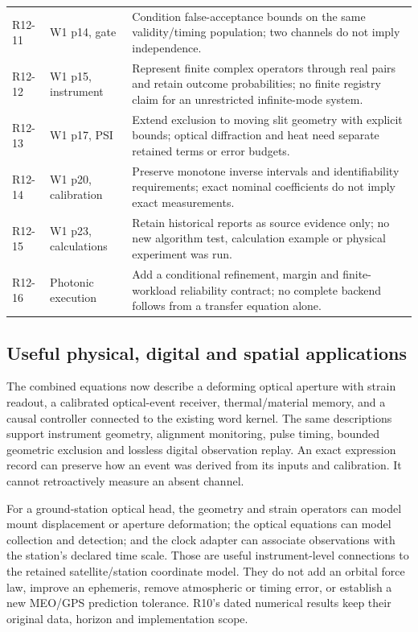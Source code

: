 \begin{longtable}{@{}P{13mm}P{43mm}P{94mm}@{}}
R12-11 & W1 p14, gate & Condition false-acceptance bounds on the same validity/timing population; two channels do not imply independence.\\
R12-12 & W1 p15, instrument & Represent finite complex operators through real pairs and retain outcome probabilities; no finite registry claim for an unrestricted infinite-mode system.\\
R12-13 & W1 p17, PSI & Extend exclusion to moving slit geometry with explicit bounds; optical diffraction and heat need separate retained terms or error budgets.\\
R12-14 & W1 p20, calibration & Preserve monotone inverse intervals and identifiability requirements; exact nominal coefficients do not imply exact measurements.\\
R12-15 & W1 p23, calculations & Retain historical reports as source evidence only; no new algorithm test, calculation example or physical experiment was run.\\
R12-16 & Photonic execution & Add a conditional refinement, margin and finite-workload reliability contract; no complete backend follows from a transfer equation alone.\\
\bottomrule
\end{longtable}
\normalsize

\subsection{Useful physical, digital and spatial applications}
The combined equations now describe a deforming optical aperture with strain
readout, a calibrated optical-event receiver, thermal/material memory, and a
causal controller connected to the existing word kernel. The same descriptions
support instrument geometry, alignment monitoring, pulse timing, bounded
geometric exclusion and lossless digital observation replay. An exact expression
record can preserve how an event was derived from its inputs and calibration.
It cannot retroactively measure an absent channel.

For a ground-station optical head, the geometry and strain operators can model
mount displacement or aperture deformation; the optical equations can model
collection and detection; and the clock adapter can associate observations with
the station's declared time scale. Those are useful instrument-level connections
to the retained satellite/station coordinate model. They do not add an orbital
force law, improve an ephemeris, remove atmospheric or timing error, or establish
a new MEO/GPS prediction tolerance. R10's dated numerical results keep their
original data, horizon and implementation scope.

